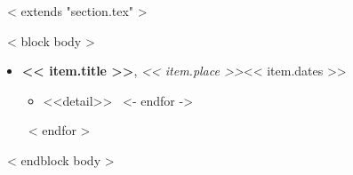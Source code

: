 ~< extends "section.tex" >~

~< block body >~
  \begin{itemize}
    \setlength\itemsep{0.5em}
    ~< for item in items >~
      \item {\bf << item.title >>}, {\it << item.place >>}\hfill << item.dates >>
        \begin{itemize}
          ~< for detail in item.details ->~
            \item <<detail>>
          ~<- endfor ->~
        \end{itemize}
    ~< endfor >~
  \end{itemize}
~< endblock body >~
